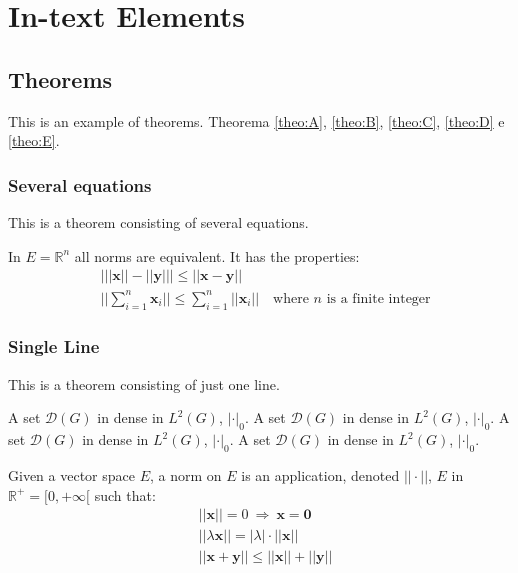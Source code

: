 

\chapter{In-text Elements}

\section{Theorems}

This is an example of theorems. Theorema \ref{theo:A}, \ref{theo:B}, \ref{theo:C}, \ref{theo:D} e \ref{theo:E}.

\subsection{Several equations}
This is a theorem consisting of several equations.

\begin{theorem}
\label{theo:A}
In $E=\mathbb{R}^n$ all norms are equivalent. It has the properties:
\begin{align}
& \big| ||\mathbf{x}|| - ||\mathbf{y}|| \big|\leq || \mathbf{x}- \mathbf{y}||\\
&  ||\sum_{i=1}^n\mathbf{x}_i||\leq \sum_{i=1}^n||\mathbf{x}_i||\quad\text{where $n$ is a finite integer}
\end{align}
\end{theorem}

\subsection{Single Line}
This is a theorem consisting of just one line.

\begin{theorem}
\label{theo:B}
A set $\mathcal{D}(G)$ in dense in $L^2(G)$, $|\cdot|_0$. A set $\mathcal{D}(G)$ in dense in $L^2(G)$, $|\cdot|_0$. 
A set $\mathcal{D}(G)$ in dense in $L^2(G)$, $|\cdot|_0$. A set $\mathcal{D}(G)$ in dense in $L^2(G)$, $|\cdot|_0$. 
\end{theorem}

\begin{exercise}
Given a vector space $E$, a norm on $E$ is an application, denoted $||\cdot||$, $E$ in $\mathbb{R}^+=[0,+\infty[$ such that:
\begin{align}
& ||\mathbf{x}||=0\ \Rightarrow\ \mathbf{x}=\mathbf{0}\\
& ||\lambda \mathbf{x}||=|\lambda|\cdot ||\mathbf{x}||\\
& ||\mathbf{x}+\mathbf{y}||\leq ||\mathbf{x}||+||\mathbf{y}||
\end{align}
\end{exercise}


